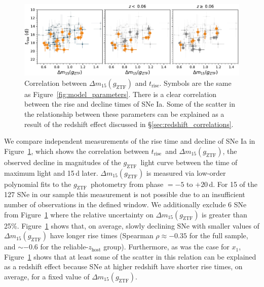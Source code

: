 \documentclass[twocolumn]{./aastex63}
\newcommand{\gztf}{$g_\mathrm{ZTF}$}
\newcommand{\trise}{$t_\mathrm{rise}$}
\begin{document}
\begin{figure}
    \centering
    \includegraphics[width=6in]{./figures/dm15_rise.pdf}
    \caption{Correlation between $\Delta m_{15}(g_\mathrm{ZTF})$ and \trise.
    Symbols are the same as Figure~\ref{fig:model_parameters}. There is a clear
    correlation between the rise and decline times of SNe Ia. Some of the
    scatter in the relationship between these parameters can be explained as a
    result of the redshift effect discussed in
    \S\ref{sec:redshift_correlations}.}
    \label{fig:dm15}
\end{figure}

We compare independent measurements of the rise time and decline of SNe Ia in
Figure~\ref{fig:dm15}, which shows the correlation between \trise\ and $\Delta
m_{15}(g_\mathrm{ZTF})$, the observed decline in magnitudes of the \gztf\
light curve between the time of maximum light and 15\,d later. $\Delta
m_{15}(g_\mathrm{ZTF})$ is measured via low-order polynomial fits to the
\gztf\ photometry from phase $= -5$ to $+20$\,d. For 15 of the 127 SNe in our
sample this measurement is not possible due to an insufficient number of
observations in the defined window. We additionally exclude 6 SNe from
Figure~\ref{fig:dm15} where the relative uncertainty on $\Delta
m_{15}(g_\mathrm{ZTF})$ is greater than 25\%. Figure~\ref{fig:dm15} shows
that, on average, slowly declining SNe with smaller values of $\Delta
m_{15}(g_\mathrm{ZTF})$ have longer rise times (Spearman $\rho \approx -0.35$
for the full sample, and $\sim$$-0.6$ for the reliable-$z_\mathrm{host}$
group). Furthermore, as was the case for $x_1$, Figure~\ref{fig:dm15} shows
that at least some of the scatter in this relation can be explained as a
redshift effect because SNe at higher redshift have shorter rise times, on
average, for a fixed value of $\Delta m_{15}(g_\mathrm{ZTF})$.
\end{document}
